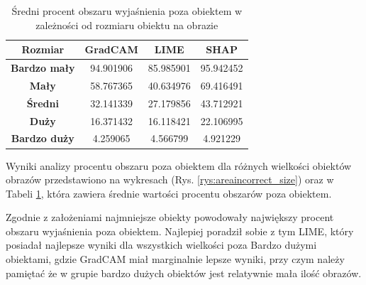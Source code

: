 \begin{table}[h]
	\centering
	\begin{tabular}{|c|c|c|c|}
		\hline
		\textbf{Rozmiar}     & \textbf{GradCAM} & \textbf{LIME} & \textbf{SHAP} \\
		\hline
		\textbf{Bardzo mały} & 94.901906        & 85.985901     & 95.942452     \\
		\hline
		\textbf{Mały}        & 58.767365        & 40.634976     & 69.416491     \\
		\hline
		\textbf{Średni}      & 32.141339        & 27.179856     & 43.712921     \\
		\hline
		\textbf{Duży}        & 16.371432        & 16.118421     & 22.106995     \\
		\hline
		\textbf{Bardzo duży} & 4.259065         & 4.566799      & 4.921229      \\
		\hline
	\end{tabular}
	\caption{Średni procent obszaru wyjaśnienia poza obiektem w zależności od rozmiaru obiektu na obrazie}
	\label{tab:size_area}
\end{table}

Wyniki analizy procentu obszaru poza obiektem dla różnych wielkości obiektów obrazów przedstawiono na wykresach (Rys. \ref{rys:areaincorrect_size}) oraz w Tabeli \ref{tab:size_area}, która zawiera średnie wartości procentu obszarów poza obiektem.

Zgodnie z założeniami najmniejsze obiekty powodowały największy procent obszaru wyjaśnienia poza obiektem.
Najlepiej poradził sobie z tym LIME, który posiadał najlepsze wyniki dla wszystkich wielkości poza Bardzo dużymi obiektami, gdzie GradCAM miał marginalnie lepsze wyniki, przy czym należy pamiętać że w grupie bardzo dużych obiektów jest relatywnie mała ilość obrazów.

\vspace{1cm}

